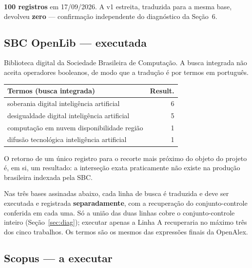 \documentclass[12pt,a4paper]{article}
\begin{document}
\noindent\textbf{100 registros} em 17/09/2026. A v1 estreita, traduzida para a mesma base,
devolveu \textbf{zero} --- confirmação independente do diagnóstico da Seção~6.

\subsection{SBC OpenLib --- executada}

Biblioteca digital da Sociedade Brasileira de Computação. A busca integrada não aceita
operadores booleanos, de modo que a tradução é por termos em português.

\begin{table}[htbp]
\centering\footnotesize
\begin{tabularx}{\textwidth}{Y r}
\toprule
\textbf{Termos (busca integrada)} & \textbf{Result.} \\
\midrule
soberania digital inteligência artificial & 6 \\
desigualdade digital inteligência artificial & 5 \\
computação em nuvem disponibilidade região & 1 \\
difusão tecnológica inteligência artificial & 1 \\
\bottomrule
\end{tabularx}
\end{table}

\noindent O retorno de um único registro para o recorte mais próximo do objeto do projeto
é, em si, um resultado: a interseção exata praticamente não existe na produção brasileira
indexada pela SBC.

\noindent Nas três bases assinadas abaixo, cada linha de busca é traduzida e deve ser
executada e registrada \textbf{separadamente}, com a recuperação do conjunto-controle
conferida em cada uma. Só a união das duas linhas cobre o conjunto-controle inteiro
(Seção~\ref{sec:diag}); executar apenas a Linha A recuperaria no máximo três dos cinco
trabalhos. Os termos são os mesmos das expressões finais da OpenAlex.

\subsection{Scopus --- a executar}
\end{document}
